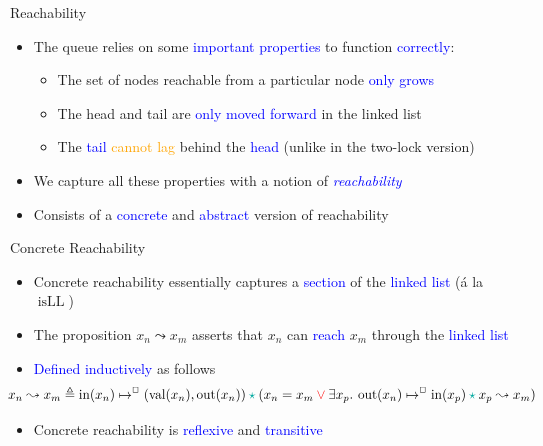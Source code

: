 \documentclass[9pt,xcolor={dvipsnames}]{beamer}
\newcommand{\isLL}{\operatorname{isLL}}
\newcommand{\nIn}[1]{\operatorname{in}(#1)}
\newcommand{\nVal}[1]{\operatorname{val}(#1)}
\newcommand{\nOut}[1]{\operatorname{out}(#1)}
\newcommand{\node}{x}
\newcommand{\nodeM}[1]{\node_{#1}}
\newcommand{\isNode}[1]{\nIn{#1} \mapsto^{\persistently} (\nVal{#1}, \nOut{#1})}
\newcommand{\reach}[2]{#1 \leadsto #2}
\let\oldlor\lor
\renewcommand{\lor}{\begingroup \color{red} \oldlor \endgroup}
\let\oldstar\star
\renewcommand{\star}{\begingroup \color{Emerald} \oldstar \endgroup}
\begin{document}
\begin{frame}{Reachability}
  \begin{itemize}
    \item The queue relies on some \textcolor{blue}{important properties} to function \textcolor{blue}{correctly}:
      \begin{itemize}
        \item The set of nodes reachable from a particular node \textcolor{blue}{only grows}
        \item The head and tail are \textcolor{blue}{only moved forward} in the linked list
        \item The \textcolor{blue}{tail} \textcolor{orange}{cannot lag} behind the \textcolor{blue}{head} (unlike in the two-lock version)
      \end{itemize}
    \pause
    \item We capture all these properties with a notion of \textcolor{blue}{\textit{reachability}}
    \item Consists of a \textcolor{blue}{concrete} and \textcolor{blue}{abstract} version of reachability
  \end{itemize}
  \pause
  \begin{block}{Concrete Reachability}
    \begin{itemize}
      \item Concrete reachability essentially captures a \textcolor{blue}{section} of the \textcolor{blue}{linked list} (á la $\isLL$)
      \item<4-> The proposition $\reach{\nodeM{n}}{\nodeM{m}}$ asserts that $\nodeM{n}$ can \textcolor{blue}{reach} $\nodeM{m}$ through the \textcolor{blue}{linked list}
      \item<5-> \textcolor{blue}{Defined inductively} as follows
    \begin{equation*}
      \hspace{-2em}\reach{\nodeM{n}}{\nodeM{m}} \eqdef \isNode{\nodeM{n}} \star{} (\nodeM{n} = \nodeM{m} \lor{} \Exists \nodeM{p} . \nOut{\nodeM{n}} \mapsto^{\persistently} \nIn{\nodeM{p}} \star{} \reach{\nodeM{p}}{\nodeM{m}})
    \end{equation*}
      \item<6-> Concrete reachability is \textcolor{blue}{reflexive} and \textcolor{blue}{transitive}
    \end{itemize}
  \end{block}
\end{frame}
\end{document}
